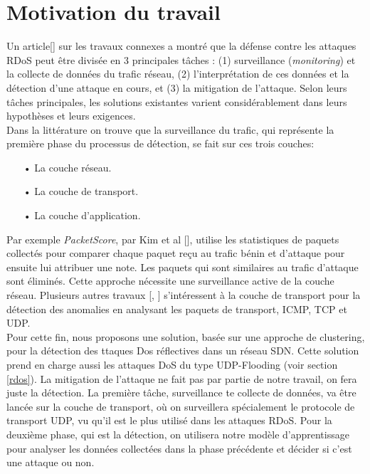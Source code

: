 \section{Motivation du travail}
Un article[\cite{21}] sur les travaux connexes a montré que la défense contre les attaques RDoS peut être divisée en 3 principales tâches : (1) surveillance (\textit{monitoring}) et la collecte de données du trafic réseau, (2) l’interprétation de ces données et la détection d’une attaque en cours, et (3) la mitigation de l’attaque. Selon leurs tâches principales, les solutions existantes varient considérablement dans leurs hypothèses et leurs exigences.\\
Dans la littérature on trouve que la surveillance du trafic, qui représente la première phase du processus de détection, se fait sur ces trois couches:\\
\begin{itemize}
\item[•] La couche réseau.
\item[•] La couche de transport.
\item[•] La couche d'application.\\
\end{itemize}

Par exemple \textit{PacketScore}, par Kim et al [\cite{22}], utilise les statistiques de paquets collectés pour comparer chaque paquet reçu au trafic bénin et d’attaque pour ensuite lui attribuer une note. Les paquets qui sont similaires au trafic d’attaque sont éliminés. Cette approche nécessite une surveillance active de la couche réseau. Plusieurs autres travaux [\cite{23}, \cite{24}] s'intéressent à la couche de transport pour la détection des anomalies en analysant les paquets de transport, ICMP, TCP et UDP.\\

Pour cette fin, nous proposons une solution, basée sur une approche de clustering, pour la détection des ttaques Dos réflectives dans un réseau SDN. Cette solution prend en charge aussi les attaques DoS du type UDP-Flooding (voir section \ref{rdos}). La mitigation de l'attaque ne fait pas par partie de notre travail, on fera juste la détection. La première tâche, surveillance te collecte de données, va être lancée sur la couche de transport, où on surveillera spécialement le protocole de transport UDP, vu qu'il est le plus utilisé dans les attaques RDoS. Pour la deuxième phase, qui est la détection, on utilisera notre modèle d'apprentissage pour analyser les données collectées dans la phase précédente et décider si c'est une attaque ou non.

